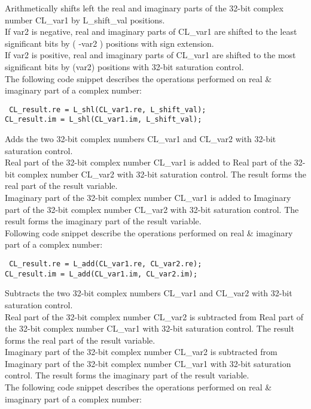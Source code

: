 
Arithmetically shifts left the real and imaginary parts of the 32-bit complex number CL\_var1 by L\_shift\_val positions.\\
If var2 is negative, real and imaginary parts of CL\_var1 are shifted to the least significant bits by ( -var2 ) positions with sign extension.\\
If var2 is positive, real and imaginary parts of CL\_var1 are shifted to the most significant bits by (var2) positions with 32-bit saturation control.\\
The following code snippet describes the operations performed on real \& imaginary part of a complex number:

{\tt {} CL\_result.re = L\_shl(CL\_var1.re, L\_shift\_val);\\
      CL\_result.im = L\_shl(CL\_var1.im, L\_shift\_val);
}


Adds the two 32-bit complex numbers CL\_var1 and CL\_var2 with 32-bit saturation control.\\
Real part of the 32-bit complex number CL\_var1 is added to Real part of the 32-bit complex number CL\_var2 with 32-bit saturation control.
The result forms the real part of the result variable.\\
Imaginary part of the 32-bit complex number CL\_var1 is added to Imaginary part of the 32-bit complex number CL\_var2 with 32-bit saturation control.
The result forms the imaginary part of the result variable.\\
Following code snippet describe the operations performed on real \& imaginary part of a complex number:

{\tt {} CL\_result.re = L\_add(CL\_var1.re, CL\_var2.re);\\
      CL\_result.im = L\_add(CL\_var1.im, CL\_var2.im);
}


Subtracts the two 32-bit complex numbers CL\_var1 and CL\_var2 with 32-bit saturation control.\\
Real part of the 32-bit complex number CL\_var2 is subtracted from Real part of the 32-bit complex number CL\_var1 with 32-bit saturation control.
The result forms the real part of the result variable.\\
Imaginary part of the 32-bit complex number CL\_var2 is subtracted from Imaginary part of the 32-bit complex number CL\_var1 with 32-bit saturation control.
The result forms the imaginary part of the result variable.\\
The following code snippet describes the operations performed on real \& imaginary part of a complex number:

